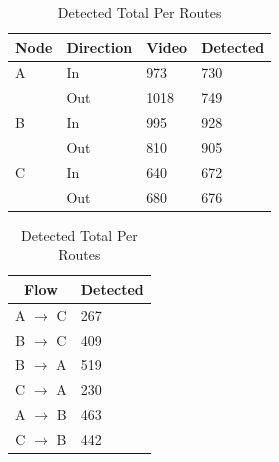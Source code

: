 \documentclass{IEEEtran}
\begin{document}
\begin{table}
    \begin{minipage}{.5\linewidth}
        \centering
        \caption{Estimated ground truth from videos and detected}
        \label{tab:groundtruth}
        \begin{tabular}{|l|l|l|l|}
        \hline
        Node & Direction & Video    & Detected \\ \hline
        A    & In        & 973      & 730      \\ \cline{2-4} 
             & Out       & 1018     & 749      \\ \hline
        B    & In        & 995      & 928      \\ \cline{2-4} 
             & Out       & 810      & 905      \\ \hline
        C    & In        & 640      & 672      \\ \cline{2-4} 
             & Out       & 680      & 676      \\ \hline
        \end{tabular}
        
    \end{minipage}%
    \begin{minipage}{.5\linewidth}
    
        \centering   
        \caption{Detected Total Per Routes}
        \label{tab:sniffedtotalroutes}
        \vspace{10px}
        \begin{tabular}{|c|l|}
        \hline
        Flow               & Detected \\ \hline
        A $\rightarrow$ C  & 267       \\ \hline
        B $\rightarrow$ C  & 409       \\ \hline
        B $\rightarrow$ A  & 519       \\ \hline
        C $\rightarrow$ A  & 230       \\ \hline
        A $\rightarrow$ B  & 463       \\ \hline
        C $\rightarrow$ B  & 442       \\ \hline
        \end{tabular}
        
    \end{minipage}
\end{table}
\end{document}
